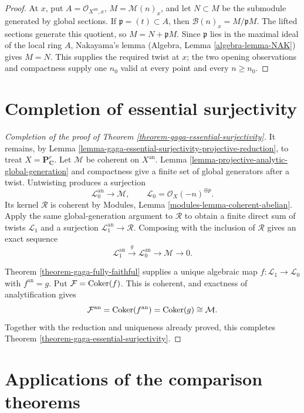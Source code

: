 \begin{proof}
At $x$, put $A=\mathcal O_{X^{\mathrm{an}},x}$,
$M=\mathcal M(n)_x$, and let $N\subset M$ be the submodule generated by
global sections. If $\mathfrak p=(t)\subset A$, then
$\mathcal B(n)_x=M/\mathfrak pM$. The lifted sections generate this
quotient, so $M=N+\mathfrak pM$. Since $\mathfrak p$ lies in the maximal
ideal of the local ring $A$, Nakayama's lemma (Algebra, Lemma
\ref{algebra-lemma-NAK}) gives $M=N$. This supplies the required twist at
$x$; the two opening observations and compactness supply one $n_0$ valid at
every point and every $n\geq n_0$.
\end{proof}

\section{Completion of essential surjectivity}
\label{section-completion-gaga-essential-surjectivity}

\begin{proof}[Completion of the proof of Theorem
\ref{theorem-gaga-essential-surjectivity}]
It remains, by Lemma
\ref{lemma-gaga-essential-surjectivity-projective-reduction}, to treat
$X=\mathbf P^r_{\mathbf C}$. Let $\mathcal M$ be coherent on
$X^{\mathrm{an}}$. Lemma
\ref{lemma-projective-analytic-global-generation} and compactness give a
finite set of global generators after a twist. Untwisting produces a
surjection
$$
\mathcal L_0^{\mathrm{an}}\longrightarrow\mathcal M,
\qquad
\mathcal L_0=\mathcal O_X(-n)^{\oplus p}.
$$
Its kernel $\mathcal R$ is coherent by Modules, Lemma
\ref{modules-lemma-coherent-abelian}. Apply the same global-generation
argument to $\mathcal R$ to obtain a finite direct sum of twists
$\mathcal L_1$ and a surjection
$\mathcal L_1^{\mathrm{an}}\to\mathcal R$. Composing with the inclusion of
$\mathcal R$ gives an exact sequence
$$
\mathcal L_1^{\mathrm{an}}\xrightarrow{g}
\mathcal L_0^{\mathrm{an}}\longrightarrow\mathcal M\longrightarrow0.
$$

Theorem \ref{theorem-gaga-fully-faithful} supplies a unique algebraic map
$f:\mathcal L_1\to\mathcal L_0$ with $f^{\mathrm{an}}=g$. Put
$\mathcal F=\mathop{\rm Coker}(f)$. This is coherent, and exactness of
analytification gives
$$
\mathcal F^{\mathrm{an}}
=\mathop{\rm Coker}(f^{\mathrm{an}})
=\mathop{\rm Coker}(g)
\cong\mathcal M.
$$
Together with the reduction and uniqueness already proved, this completes
Theorem \ref{theorem-gaga-essential-surjectivity}.
\end{proof}

\section{Applications of the comparison theorems}
\label{section-gaga-applications}

